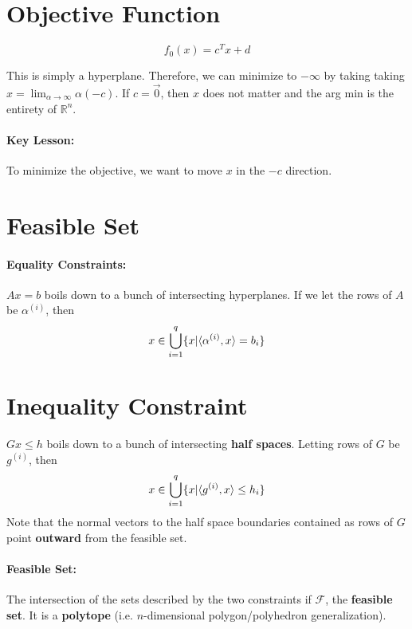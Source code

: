 \documentclass[a4paper,12pt]{report}
\DeclarePairedDelimiter\inpr{\langle}{\rangle}%
\begin{document}
\section{Objective Function}

\begin{equation}
f_0(x) = c^T x + d
\end{equation}

This is simply a hyperplane. Therefore, we can minimize to $-\infty$ by taking taking $x = \lim_{\alpha\to\infty} \alpha(-c)$. 
If $c=\vec 0$, then $x$ does not matter and the arg min is the entirety of $\mathbb{R}^n$.

\paragraph{Key Lesson: } To minimize the objective, we want to move $x$ in the $-c$ direction.


\section{Feasible Set}

\paragraph{Equality Constraints: } $Ax = b$ boils down to a bunch of intersecting hyperplanes. If we let the rows of $A$ be $\alpha^{(i)}$, then
\begin{equation}
x\in \bigcup\limits_{i=1}^{q}\{x | \inpr{\alpha^{(i)}, x} = b_i \}
\end{equation}


\section{Inequality Constraint} $Gx \leq h$ boils down to a bunch of intersecting \textbf{half spaces}. Letting rows  of $G$ be $g^{(i)}$, then
\begin{equation}
x\in \bigcup\limits_{i=1}^q \{ x | \inpr{g^{(i)}, x} \leq h_i \}
\end{equation}
Note that the normal vectors to the half space boundaries contained as rows of $G$ point \textbf{outward} from the feasible set. 

\paragraph{Feasible Set: } The intersection of the sets described by the two constraints if $\mathcal{F}$, the \textbf{feasible set}. It is a \textbf{polytope} (i.e. $n$-dimensional polygon/polyhedron generalization).
\end{document}
